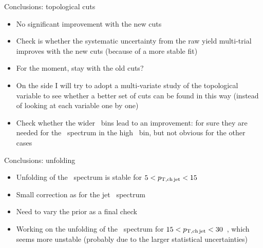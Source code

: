 \documentclass[xcolor={usenames,dvipsnames}]{beamer}
\begin{document}
\begin{frame}{Conclusions: topological cuts}
\begin{itemize}
\item No significant improvement with the new cuts
\item Check is whether the systematic uncertainty from the raw yield multi-trial improves with the new cuts (because of a more stable fit)
\item For the moment, stay with the old cuts?
\item On the side I will try to adopt a multi-variate study of the topological variable to see whether a better set of cuts can be found in this way (instead of looking at each variable one by one)
\item Check whether the wider \ptd\ bins lead to an improvement: for sure they are needed for the \zpar\ spectrum in the high \ptchjet\ bin, but not obvious for the other cases
\end{itemize}
\end{frame}

\begin{frame}{Conclusions: unfolding}
\begin{itemize}
\item Unfolding of the \zpar\ spectrum is stable for $5<p_{\mathrm{T,ch\, jet}}<15$~\GeVc
\item Small correction as for the jet \pt\ spectrum
\item Need to vary the prior as a final check
\item Working on the unfolding of the \zpar\ spectrum for $15<p_{\mathrm{T,ch\, jet}}<30$~\GeVc, which seems more unstable (probably due to the larger statistical uncertainties)
\end{itemize}
\end{frame}
\end{document}

